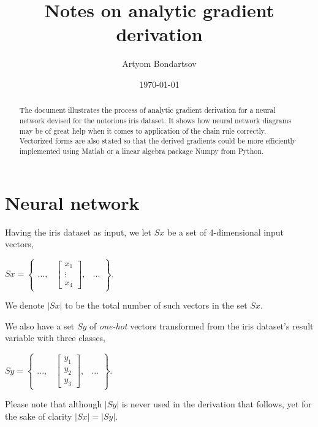 \documentclass[a4paper,12pt,notitlepage]{article}
\title{Notes on analytic gradient derivation}
\author{Artyom Bondartsov}
\date{\today}
\begin{document}
\maketitle
\begin{abstract}
The document illustrates the process of analytic gradient derivation for a neural network devised for the notorious iris dataset. It shows how neural network diagrams may be of great help when it comes to application of the chain rule correctly. Vectorized forms are also stated so that the derived gradients could be more efficiently implemented using Matlab or a linear algebra package Numpy from Python.
\end{abstract}

\section*{Neural network}
Having the iris dataset as input, we let $Sx$ be a set of 4-dimensional input vectors,
\begin{center}
$Sx=\begin{Bmatrix}
 ..., & \begin{bmatrix}
x_{1}\\ 
\vdots\\
x_{4} 
\end{bmatrix},&... 
\end{Bmatrix}$.
\end{center}
We denote $|Sx|$ to be the total number of such vectors in the set $Sx$.

We also have a set $Sy$ of \emph{one-hot} vectors transformed from the iris dataset's result variable with three classes, 
\begin{center}
 $Sy=\begin{Bmatrix}
 ..., & \begin{bmatrix}
y_{1}\\ 
y_{2}\\ 
y_{3} 

\end{bmatrix},&... 
\end{Bmatrix}$.
\end{center}
Please note that although $|Sy|$ is never used in the derivation that follows, yet for the sake of clarity $|Sx|=|Sy|$.
\end{document}
